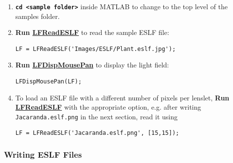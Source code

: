 \documentclass[onecolumn]{article}
\newcommand{\CiteFunc}[1]{\hyperlink{#1}{\small #1}}
\newcommand{\SymbolText}[1]{\texttt{\small #1}}
\begin{document}
\begin{enumerate}[leftmargin=1.5em,rightmargin=0.5cm]

\item \textbf{\SymbolText{cd <sample folder>}} inside MATLAB to change to the top level of the samples folder.

\item \textbf{Run \CiteFunc{LFReadESLF}} to read the sample ESLF file:
\begin{Verbatim}
LF = LFReadESLF('Images/ESLF/Plant.eslf.jpg');
\end{Verbatim}

\item \textbf{Run \CiteFunc{LFDispMousePan}} to display the light field:
\begin{Verbatim}
LFDispMousePan(LF);
\end{Verbatim}

\item To load an ESLF file with a different number of pixels per lenslet, \textbf{Run \CiteFunc{LFReadESLF}} with the appropriate option, e.g. after writing \SymbolText{Jacaranda.eslf.png} in the next section, read it using
\begin{Verbatim}
LF = LFReadESLF('Jacaranda.eslf.png', [15,15]);
\end{Verbatim}
\end{enumerate}

\subsubsection{Writing ESLF Files}
\end{document}
